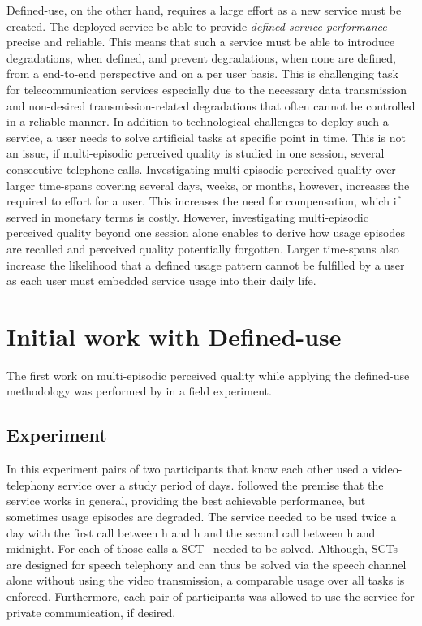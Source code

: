 Defined-use, on the other hand, requires a large effort as a new service must be created.
The deployed service be able to provide \emph{defined service performance} precise and reliable.
This means that such a service must be able to introduce degradations, when defined, and prevent degradations, when none are defined, from a end-to-end perspective and on a per user basis.
This is challenging task for telecommunication services especially due to the necessary data transmission and non-desired transmission-related degradations that often cannot be controlled in a reliable manner.
In addition to technological challenges to deploy such a service, a user needs to solve artificial tasks at specific point in time.
This is not an issue, if multi-episodic perceived quality is studied in one session, \eg several consecutive telephone calls.
Investigating multi-episodic perceived quality over larger time-spans covering several days, weeks, or months, however, increases the required to effort for a user.
This increases the need for compensation, which if served in monetary terms is costly.
However, investigating multi-episodic perceived quality beyond one session alone enables to derive how usage episodes are recalled and perceived quality potentially forgotten.
Larger time-spans also increase the likelihood that a defined usage pattern cannot be fulfilled by a user as each user must embedded service usage into their daily life.

\section{Initial work with Defined-use}
The first work on multi-episodic perceived quality while applying the defined-use methodology was performed by \cite{moller_single-call_2011} in a field experiment.

\subsection{Experiment}
In this experiment pairs of two participants that know each other used a video-telephony service over a study period of \unit[12]{days}.
\cite{moller_single-call_2011} followed the premise that the service works in general, \ie providing the best achievable performance, but sometimes usage episodes are degraded.
The service needed to be used twice a day with the first call between \unit[6]{h} and \unit[15]{h} and the second call between \unit[15]{h} and midnight.
For each of those \unit[24]{calls} a \acf{SCT}~\citep{itu-t_p.805:_2007} needed to be solved. %
Although, \acp{SCT} are designed for speech telephony and can thus be solved via the speech channel alone without using the video transmission, a comparable usage over all tasks is enforced.
Furthermore, each pair of participants was allowed to use the service for private communication, if desired.

